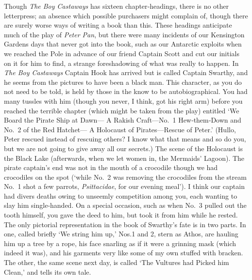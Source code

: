 Though \emph{The Boy Castaways} has sixteen chapter‐headings,
there is no other letterpress;
an absence which possible purchasers might complain of,
though there are surely worse ways of writing a book than this.
These headings anticipate much of the play of \emph{Peter Pan},
but there were many incidents of our Kensington Gardens days that never got into the book,
such as our Antarctic exploits
when we reached the Pole in advance of our friend Captain Scott
and cut our initials on it for him to find,
a strange foreshadowing of what was really to happen.
In \emph{The Boy Castaways} Captain Hook has arrived but is called Captain Swarthy,
and he seems from the pictures to have been a black man.
This character, as you do not need to be told,
is held by those in the know to be autobiographical.
You had many tussles with him
(though you never, I think, got his right arm)
before you reached the terrible chapter
(which might be taken from the play)
entitled ‘We Board the Pirate Ship at Dawn—%
A Rakish Craft—No.~1 Hew‐them‐Down and No.~2 of the Red Hatchet—%
A Holocaust of Pirates—Rescue of Peter.’
(Hullo, Peter rescued instead of rescuing others?
I know what that means and so do you, but we are not going to give away all our secrets.)
The scene of the Holocaust is the Black Lake
(afterwards, when we let women in, the Mermaids’ Lagoon).
The pirate captain’s end was not in the mouth of a crocodile though we had crocodiles on the spot
(‘while No.~2 was removing the crocodiles from the stream
No.~1 shot a few parrots, \emph{Psittacidae}, for our evening meal’).
I think our captain had divers deaths owing to unseemly competition among you,
each wanting to slay him single‐handed.
On a special occasion, such as when No.~3 pulled out the tooth himself,
you gave the deed to him, but took it from him while he rested.
The only pictorial representation in the book of Swarthy’s fate is in two parts.
In one, called briefly ‘We string him up,’
Nos.\@ 1 and 2, stern as Athos, are hauling him up a tree by a rope,
his face snarling as if it were a grinning mask (which indeed it was),
and his garments very like some of my own stuffed with bracken.
The other, the same scene next day, is called ‘The Vultures had Picked him Clean,’
and tells its own tale.

